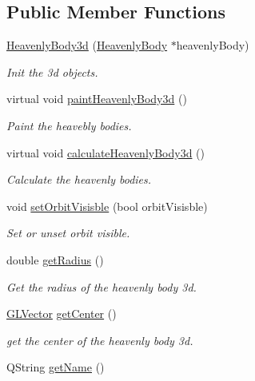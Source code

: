 \subsection*{\-Public \-Member \-Functions}
\begin{DoxyCompactItemize}
\item 
\hyperlink{classHeavenlyBody3d_aa720873967d60dd36a7531545f25f5ce}{\-Heavenly\-Body3d} (\hyperlink{classHeavenlyBody}{\-Heavenly\-Body} $\ast$heavenly\-Body)
\begin{DoxyCompactList}\small\item\em \-Init the 3d objects. \end{DoxyCompactList}\item 
virtual void \hyperlink{classHeavenlyBody3d_a030592ed6fd43987d2b004f56a3ab3a8}{paint\-Heavenly\-Body3d} ()
\begin{DoxyCompactList}\small\item\em \-Paint the heavebly bodies. \end{DoxyCompactList}\item 
virtual void \hyperlink{classHeavenlyBody3d_ac1c46a03505f9b7bb57191f22d50ba27}{calculate\-Heavenly\-Body3d} ()
\begin{DoxyCompactList}\small\item\em \-Calculate the heavenly bodies. \end{DoxyCompactList}\item 
void \hyperlink{classHeavenlyBody3d_abc21e2ca9a6222ef3edfac68738ecb7d}{set\-Orbit\-Visisble} (bool orbit\-Visisble)
\begin{DoxyCompactList}\small\item\em \-Set or unset orbit visible. \end{DoxyCompactList}\item 
double \hyperlink{classHeavenlyBody3d_a6a626af4873c1783a7134a75aa27936b}{get\-Radius} ()
\begin{DoxyCompactList}\small\item\em \-Get the radius of the heavenly body 3d. \end{DoxyCompactList}\item 
\hyperlink{classGLVector}{\-G\-L\-Vector} \hyperlink{classHeavenlyBody3d_abc8856ee19131167a631f66cb0e40105}{get\-Center} ()
\begin{DoxyCompactList}\small\item\em get the center of the heavenly body 3d. \end{DoxyCompactList}\item 
\-Q\-String \hyperlink{classHeavenlyBody3d_afde15f252ebff5b5a791f42ad6aca61d}{get\-Name} ()

\end{DoxyCompactItemize}
